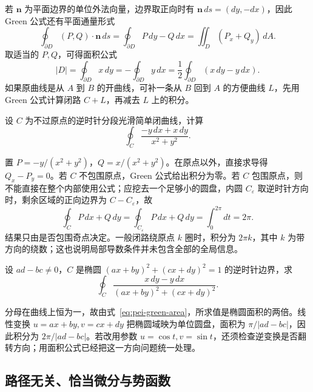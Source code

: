 若 $\boldsymbol n$ 为平面边界的单位外法向量，边界取正向时有 $\boldsymbol n\,ds=(dy,-dx)$，因此 Green 公式还有平面通量形式
\begin{equation}
\label{eq:pei-planar-flux}
\oint_{\partial D}(P,Q)\cdot\boldsymbol n\,ds
=\oint_{\partial D}P\,dy-Q\,dx
=\iint_D(P_x+Q_y)\,dA.
\end{equation}
取适当的 $P,Q$，可得面积公式
\begin{equation}
\label{eq:pei-green-area}
|D|=\oint_{\partial D}x\,dy
=-\oint_{\partial D}y\,dx
=\frac12\oint_{\partial D}(x\,dy-y\,dx).
\end{equation}
如果原曲线是从 $A$ 到 $B$ 的开曲线，可补一条从 $B$ 回到 $A$ 的方便曲线 $L$，先用 Green 公式计算闭路 $C+L$，再减去 $L$ 上的积分。

\begin{example}
\label{ex:pei-punctured-circulation}
设 $C$ 为不过原点的逆时针分段光滑简单闭曲线，计算
\[
\oint_C\frac{-y\,dx+x\,dy}{x^2+y^2}.
\]
\end{example}
\begin{solve}
置 $P=-y/(x^2+y^2)$，$Q=x/(x^2+y^2)$。在原点以外，直接求导得 $Q_x-P_y=0$。若 $C$ 不包围原点，Green 公式给出积分为零。若 $C$ 包围原点，则不能直接在整个内部使用公式；应挖去一个足够小的圆盘，内圆 $C_\varepsilon$ 取逆时针方向时，剩余区域的正向边界为 $C-C_\varepsilon$，故
\[
\oint_C P\,dx+Q\,dy=\oint_{C_\varepsilon}P\,dx+Q\,dy
=\int_0^{2\pi}dt=2\pi.
\]
结果只由是否包围奇点决定。一般闭路绕原点 $k$ 圈时，积分为 $2\pi k$，其中 $k$ 为带方向的绕数；这也说明局部导数条件并未包含全部的全局信息。
\end{solve}

\begin{example}
\label{ex:pei-linear-ellipse-line}
设 $a d-b c\ne0$，$C$ 是椭圆 $(ax+by)^2+(cx+dy)^2=1$ 的逆时针边界，求
\[
\oint_C\frac{x\,dy-y\,dx}{(ax+by)^2+(cx+dy)^2}.
\]
\end{example}
\begin{solve}
分母在曲线上恒为一，故由式~\eqref{eq:pei-green-area}，所求值是椭圆面积的两倍。线性变换 $u=ax+by,v=cx+dy$ 把椭圆域映为单位圆盘，面积为 $\pi/|ad-bc|$，因此积分为 $2\pi/|ad-bc|$。若改用参数 $u=\cos t,v=\sin t$，还须检查逆变换是否翻转方向；用面积公式已经把这一方向问题统一处理。
\end{solve}

\subsection{路径无关、恰当微分与势函数}

